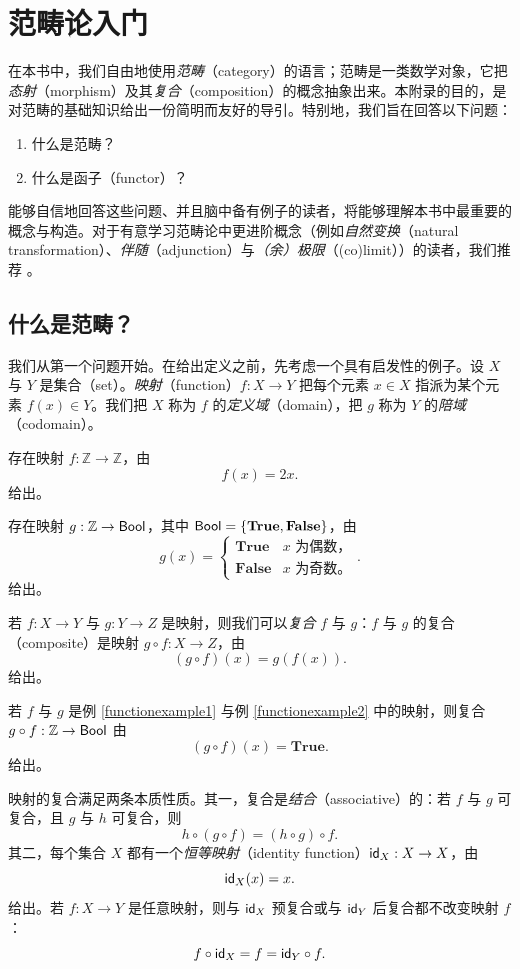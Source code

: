 \chapter{范畴论入门}\label{categorytheoryappendix}

在本书中，我们自由地使用\emph{范畴}（category）的语言；范畴是一类数学对象，它把{\it 态射}（morphism）及其{\it 复合}（composition）的概念抽象出来。本附录的目的，是对范畴的基础知识给出一份简明而友好的导引。特别地，我们旨在回答以下问题：
\begin{enumerate}
    \item 什么是范畴？
    \item 什么是函子（functor）？
\end{enumerate}
能够自信地回答这些问题、并且脑中备有例子的读者，将能够理解本书中最重要的概念与构造。对于有意学习范畴论中更进阶概念（例如{\it 自然变换}（natural transformation）、{\it 伴随}（adjunction）与{\it （余）极限}（(co)limit））的读者，我们推荐 \cite{categoriesfortheworkingmathematician}。

\section{什么是范畴？}
我们从第一个问题开始。在给出定义之前，先考虑一个具有启发性的例子。设 $X$ 与 $Y$ 是集合（set）。{\it 映射}（function）$f:X \to Y$ 把每个元素 $x \in X$ 指派为某个元素 $f(x) \in Y$。我们把 $X$ 称为 $f$ 的{\it 定义域}（domain），把 $g$ 称为 $Y$ 的{\it 陪域}（codomain）。

\begin{example}\label{functionexample1} 存在映射 $f:\mathbb{Z} \to \mathbb{Z}$，由
\[
f(x) = 2x.
\]
给出。
\end{example}
\begin{example}\label{functionexample2} 存在映射 $g:\mathbb{Z} \to \mathsf{Bool}$，其中 $\mathsf{Bool} = \{\mathbf{True},\mathbf{False}\}$，由
\[
g(x) = \begin{cases}\mathbf{True} & x \text{ 为偶数，}\\
\mathbf{False} & x \text{ 为奇数。}
\end{cases}.
\]
给出。
\end{example}
若 $f:X \to Y$ 与 $g:Y \to Z$ 是映射，则我们可以{\it 复合} $f$ 与 $g$：$f$ 与 $g$ 的复合（composite）是映射 $g \circ f:X \to Z$，由
\[
(g \circ f)(x) = g(f(x)).
\]
给出。
\begin{example}若 $f$ 与 $g$ 是例 \ref{functionexample1} 与例 \ref{functionexample2} 中的映射，则复合 $g \circ f:\mathbb{Z} \to \mathsf{Bool}$ 由
\[
(g \circ f)(x) = \mathbf{True}.
\]
给出。
\end{example}
映射的复合满足两条本质性质。其一，复合是{\it 结合}（associative）的：若 $f$ 与 $g$ 可复合，且 $g$ 与 $h$ 可复合，则
    \[
    h \circ (g \circ f) = (h \circ g) \circ f.
    \]
其二，每个集合 $X$ 都有一个{\it 恒等映射}（identity function）$\mathsf{id}_X:X \to X$，由
    \[\mathsf{id}_X(x) = x.\]
    给出。若 $f:X \to Y$ 是任意映射，则与 $\mathsf{id}_X$ 预复合或与 $\mathsf{id}_Y$ 后复合都不改变映射 $f$：
    \[
    f \circ \mathsf{id}_X = f = \mathsf{id}_Y \circ f.
    \]


